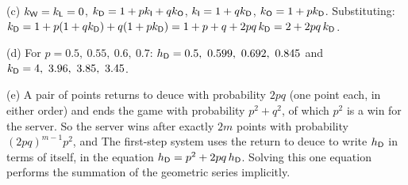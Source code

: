 \begin{enumerate}[resume*=quiz]
\begin{solution}
(c) $k_{\mathsf{W}}=k_{\mathsf{L}}=0$, $k_{\mathsf{D}}=1+pk_{\mathsf{I}}+qk_{\mathsf{O}}$, $k_{\mathsf{I}}=1+qk_{\mathsf{D}}$, $k_{\mathsf{O}}=1+pk_{\mathsf{D}}$.
Substituting: $k_{\mathsf{D}}=1+p(1+qk_{\mathsf{D}})+q(1+pk_{\mathsf{D}})=1+p+q+2pq\,k_{\mathsf{D}}=2+2pq\,k_{\mathsf{D}}$.

(d) For $p=0.5,\ 0.55,\ 0.6,\ 0.7$: $h_{\mathsf{D}}=0.5,\ 0.599,\ 0.692,\ 0.845$ and $k_{\st D}=4,\ 3.96,\ 3.85,\ 3.45$.

(e) A pair of points returns to deuce with probability $2pq$ (one point each, in either order) and ends the game with probability $p^2+q^2$, of which $p^2$ is a win for the server. So the server wins after exactly $2m$ points with probability $(2pq)^{m-1}p^2$, and
The first-step system uses the return to deuce to write $h_{\mathsf{D}}$ in terms of itself, in the equation $h_{\mathsf{D}}=p^2+2pq\,h_{\mathsf{D}}$. Solving this one equation performs the summation of the geometric series implicitly.
\end{solution}
\end{enumerate}
